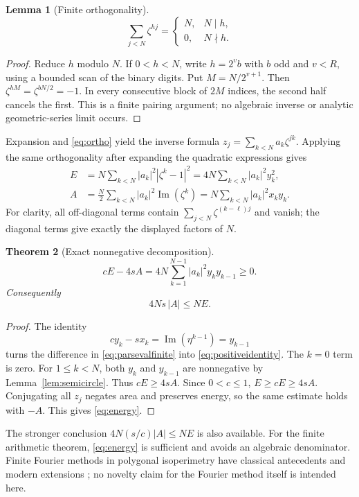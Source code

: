 \documentclass[11pt,a4paper]{article}
\newtheorem{theorem}{Theorem}[section]
\newtheorem{lemma}[theorem]{Lemma}
\theoremstyle{definition}
\newcommand{\Ima}{\operatorname{Im}}
\begin{document}
\begin{lemma}[Finite orthogonality]\label{lem:ortho}
\[
 \sum_{j<N}\zeta^{hj}=
 \begin{cases}
 N,&N\mid h,\\
 0,&N\nmid h.
 \end{cases}
 \tag{5.3}\label{eq:ortho}
\]
\end{lemma}
\begin{proof}
Reduce \(h\) modulo \(N\). If \(0<h<N\), write \(h=2^vb\)
with \(b\) odd and \(v<R\), using a bounded scan of the binary digits.
Put \(M=N/2^{v+1}\). Then
\(\zeta^{hM}=\zeta^{bN/2}=-1\).
In every consecutive block of \(2M\) indices, the second half cancels
the first. This is a finite pairing argument; no algebraic inverse
or analytic geometric-series limit occurs.
\end{proof}

Expansion and \eqref{eq:ortho} yield the inverse formula
\(z_j=\sum_{k<N}a_k\zeta^{jk}\). Applying the same orthogonality after
expanding the quadratic expressions gives
\[
 \begin{aligned}
 E&=N\sum_{k<N}|a_k|^2|\zeta^k-1|^2
   =4N\sum_{k<N}|a_k|^2y_k^2,\\
 A&=\frac N2\sum_{k<N}|a_k|^2\Ima(\zeta^k)
   =N\sum_{k<N}|a_k|^2x_ky_k.
 \end{aligned}
 \tag{5.4}\label{eq:parsevalfinite}
\]
For clarity, all off-diagonal terms contain
\(\sum_{j<N}\zeta^{(k-\ell)j}\) and vanish; the diagonal terms
give exactly the displayed factors of \(N\).

\begin{theorem}[Exact nonnegative decomposition]\label{thm:spectral}
\[
 \boxed{cE-4sA
   =4N\sum_{k=1}^{N-1}|a_k|^2y_ky_{k-1}\ge0.}
 \tag{5.5}\label{eq:positiveidentity}
\]
Consequently
\[
 4Ns\,|A|\le NE.
 \tag{5.6}\label{eq:energy}
\]
\end{theorem}
\begin{proof}
The identity
\[
 cy_k-sx_k=\Ima(\eta^{k-1})=y_{k-1}
\]
turns the difference in \eqref{eq:parsevalfinite} into
\eqref{eq:positiveidentity}. The \(k=0\) term is zero.
For \(1\le k<N\), both \(y_k\) and \(y_{k-1}\) are nonnegative
by Lemma~\ref{lem:semicircle}. Thus \(cE\ge4sA\).
Since \(0<c\le1\), \(E\ge cE\ge4sA\).
Conjugating all \(z_j\) negates area and preserves energy, so the
same estimate holds with \(-A\). This gives \eqref{eq:energy}.
\end{proof}

The stronger conclusion \(4N(s/c)|A|\le NE\) is also available.
For the finite arithmetic theorem, \eqref{eq:energy} is sufficient
and avoids an algebraic denominator. Finite Fourier methods in
polygonal isoperimetry have classical antecedents and modern
extensions \cite{kwong}; no novelty claim for the Fourier method
itself is intended here.
\end{document}
